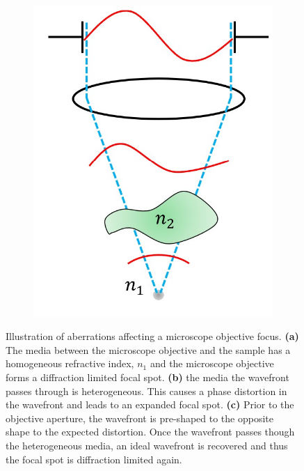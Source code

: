 \begin{figure}[h]
\begin{subfigure}[t]{0.3\textwidth}
		\includegraphics[width=\linewidth]{images/wavefront_focus_corrected.jpg}
		\caption{}
		\label{fig:wavefront_focus_corrected}
	\end{subfigure}
	\caption[Illustration of aberrations affecting a microscope
          objective focus.]{Illustration of aberrations affecting a
          microscope objective focus. \textbf{(a)} The media between
          the microscope objective and the sample has a homogeneous refractive index, $n_{1}$ and the microscope objective forms a diffraction limited focal spot. \textbf{(b)} the media the wavefront passes through is heterogeneous. This causes a phase distortion in the wavefront and leads to an expanded focal spot. \textbf{(c)} Prior to the objective aperture, the wavefront is pre-shaped to the opposite shape to the expected distortion. Once the wavefront passes though the heterogeneous media, an ideal wavefront is recovered and thus the focal spot is diffraction limited again.}
	\label{fig:wavefront_focus}
\end{figure}

